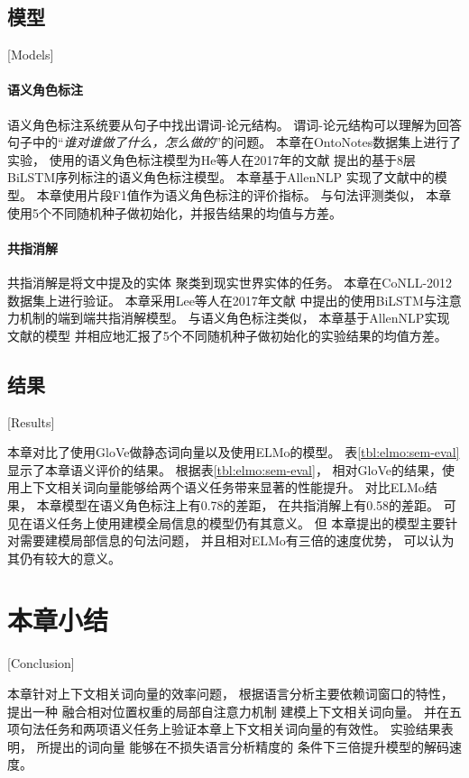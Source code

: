 \subsection{模型}[Models]

\paragraph{语义角色标注} 
语义角色标注系统要从句子中找出谓词-论元结构。
谓词-论元结构可以理解为回答句子中的``\textit{谁对谁做了什么，怎么做的}''的问题。
本章在OntoNotes数据集\cite{W13-3516}上进行了实验，
使用的语义角色标注模型为He等人在2017年的文献
提出的基于8层BiLSTM序列标注的语义角色标注模型。
本章基于AllenNLP \cite{W18-2501}实现了文献中的模型。
本章使用片段F1值作为语义角色标注的评价指标。
与句法评测类似，
本章使用5个不同随机种子做初始化，并报告结果的均值与方差。

\paragraph{共指消解}
共指消解是将文中提及的实体
聚类到现实世界实体的任务。
本章在CoNLL-2012数据集\cite{W12-4501}上进行验证。
本章采用Lee等人在2017年文献
中提出的使用BiLSTM与注意力机制的端到端共指消解模型。
与语义角色标注类似，
本章基于AllenNLP实现文献的模型
并相应地汇报了5个不同随机种子做初始化的实验结果的均值方差。

\subsection{结果}[Results]

本章对比了使用GloVe做静态词向量以及使用ELMo的模型。
表\ref{tbl:elmo:sem-eval}显示了本章语义评价的结果。
根据表\ref{tbl:elmo:sem-eval}，
相对GloVe的结果，使用上下文相关词向量能够给两个语义任务带来显著的性能提升。
对比ELMo结果，
本章模型在语义角色标注上有0.78的差距，
在共指消解上有0.58的差距。
可见在语义任务上使用建模全局信息的模型仍有其意义。
但
本章提出的模型主要针对需要建模局部信息的句法问题，
并且相对ELMo有三倍的速度优势，
可以认为其仍有较大的意义。

\section{本章小结}[Conclusion]

本章针对上下文相关词向量的效率问题，
根据语言分析主要依赖词窗口的特性，
提出一种
融合相对位置权重的局部自注意力机制
建模上下文相关词向量。
并在五项句法任务和两项语义任务上验证本章上下文相关词向量的有效性。
实验结果表明，
所提出的词向量
能够在不损失语言分析精度的
条件下三倍提升模型的解码速度。
